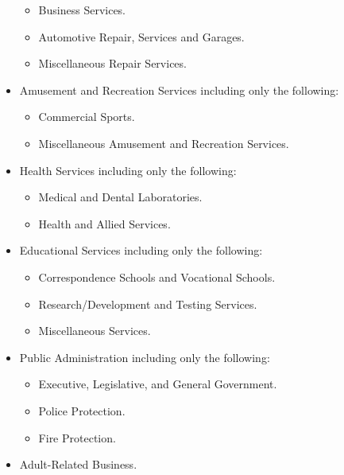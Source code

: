 \begin{itemize}
\begin{itemize}
\item Business Services.

\item Automotive Repair, Services and Garages.

\item Miscellaneous Repair Services.
\end{itemize}
\item Amusement and Recreation Services including only the following:
\begin{itemize}
\item Commercial Sports.

\item Miscellaneous Amusement and Recreation Services.
\end{itemize}
\item Health Services including only the following:
\begin{itemize}
\item Medical and Dental Laboratories.

\item Health and Allied Services.
\end{itemize}
\item Educational Services including only the following:
\begin{itemize}
\item Correspondence Schools and Vocational Schools.

\item Research/Development and Testing Services.

\item Miscellaneous Services.
\end{itemize}
\item Public Administration including only the following:
\begin{itemize}
\item Executive, Legislative, and General Government.

\item Police Protection.

\item Fire Protection.
\end{itemize}
\item Adult-Related Business.
\end{itemize}

